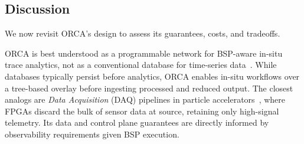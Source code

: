 
\subsection{Discussion}\label{sec:orca:design-discussion}


We now revisit ORCA's design to assess its guarantees, costs, and tradeoffs.



ORCA is best understood as a programmable network for BSP-aware in-situ trace analytics, not as
a conventional database for time-series data~\cite{:Prometheus,Agela2014:LDMS}.
While databases typically persist before analytics, ORCA enables in-situ workflows over a
tree-based overlay before ingesting processed and reduced output.
The closest analogs are \emph{Data Acquisition} (DAQ) pipelines in particle
accelerators~\cite{Aboli2016:DAQ-ATLAS,Bauer2012:DAQ-CMS}, where
FPGAs discard the bulk of sensor data at source, retaining only high-signal telemetry.
Its data and control plane guarantees are directly informed by observability requirements
given BSP execution.

